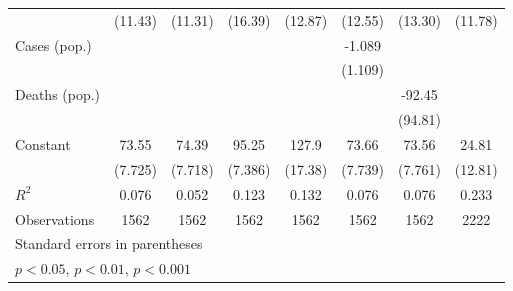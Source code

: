 \documentclass{article}
\begin{document}
{\begin{longtable}{l*{7}{c}}
                &  (11.43)         &  (11.31)         &  (16.39)         &  (12.87)         &  (12.55)         &  (13.30)         &  (11.78)         \\
Cases (pop.)    &                  &                  &                  &                  &   -1.089         &                  &                  \\
                &                  &                  &                  &                  &  (1.109)         &                  &                  \\
Deaths (pop.)   &                  &                  &                  &                  &                  &   -92.45         &                  \\
                &                  &                  &                  &                  &                  &  (94.81)         &                  \\
Constant        &    73.55\sym{***}&    74.39\sym{***}&    95.25\sym{***}&    127.9\sym{***}&    73.66\sym{***}&    73.56\sym{***}&    24.81         \\
                &  (7.725)         &  (7.718)         &  (7.386)         &  (17.38)         &  (7.739)         &  (7.761)         &  (12.81)         \\
\hline
\(R^{2}\)       &    0.076         &    0.052         &    0.123         &    0.132         &    0.076         &    0.076         &    0.233         \\
Observations    &     1562         &     1562         &     1562         &     1562         &     1562         &     1562         &     2222         \\
\hline\hline
\multicolumn{8}{l}{\footnotesize Standard errors in parentheses}\\
\multicolumn{8}{l}{\footnotesize \sym{*} \(p<0.05\), \sym{**} \(p<0.01\), \sym{***} \(p<0.001\)}\\
\end{longtable}
}
\end{document}
